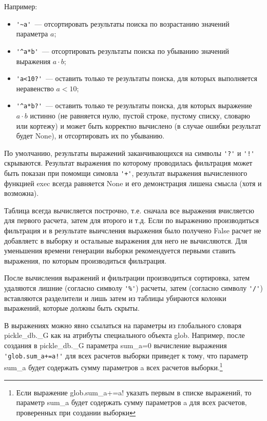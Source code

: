 Например:
\begin{itemize}
\item \verb|'~a'|~--- отсортировать результаты поиска по возрастанию значений
  параметра $a$;
\item \verb|'^a*b'|~--- отсортировать результаты поиска по убыванию значений
  выражения $a\cdot b$;
\item \verb|'a<10?'|~--- оставить только те результаты поиска, для которых
  выполняется неравенство $a<10$;
\item \verb|'^a*b?'|~--- оставить только те результаты поиска, для которых
  выражение $a\cdot b$ истинно (не равняется нулю, пустой строке, пустому списку,
  словарю или кортежу) и может быть корректно вычислено (в случае
  ошибки результат будет {\sf None}), и отсортировать их по убыванию.
\end{itemize}

По умолчанию, результаты выражений заканчивающихся на символы \verb|'?'| и
\verb|'!'| скрываются. Результат выражения по которому проводилась фильтрация
может быть показан при помомщи симовла \verb|'+'|, результат выражения
вычисленного функцией {\sf exec} всегда равняется {\sf None} и его
демонстрация лишена смысла (хотя и возможна).

Таблица всегда вычисляется построчно, т.е. сначала все выражения вчисляетсю
для первого расчета, затем для второго и т.д. Если по выражению производиться
фильтрация и в результате выичсления выражения было получено {\sf False}
расчет не добавляетс в выборку и остальные выражения для него не
вычисляются. Для уменьшения времени генерации выборки рекомендуется первыми
ставить выражения, по которым производиться фильтрация. 

После вычисления выражений и фильтрации производиться сортировка, затем
удаляются лишние (согласно символу \verb|'%'|) расчеты, затем (согласно
символу \verb|'/'|) вставляются разделители и лишь затем из таблицы убираются
колонки выражений, которые должны быть скрыты. 

В выражениях можно явно ссылаться на параметры из глобального словаря {\sf
  pickle\_db.\_G} как на атрибуты специального объекта {\sf glob}. Например,
после создания в {\sf pickle\_db.\_G} параметра {\sf sum\_a=0} вычисление выражения
\verb|'glob.sum_a+=a!'| для всех расчетов выборки приведет к тому, что
параметр {\sf sum\_a} будет содержать сумму параметров {\sf a} всех расчетов
выборки.\footnote{Если выражение {\sf glob.sum\_a+=a!} указать первым в
  списке выражений, то параметр {\sf sum\_a} будет содержать сумму 
  параметров {\sf a} для всех расчетов, проверенных при создании выборки}  


